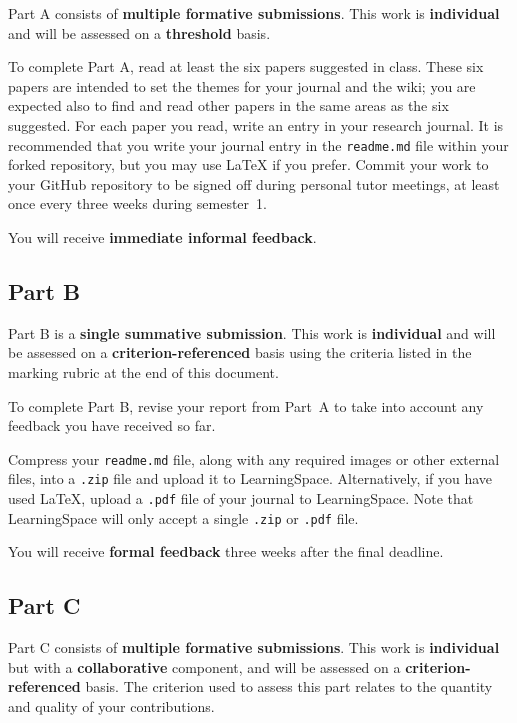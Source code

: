 \documentclass{../fal_assignment}
\begin{document}
Part A consists of \textbf{multiple formative submissions}. This work is \textbf{individual} and will be assessed on a \textbf{threshold} basis.

To complete Part A, read at least the six papers suggested in class.
These six papers are intended to set the themes for your journal and the wiki;
you are expected also to find and read other papers in the same areas as the six suggested.
For each paper you read, write an entry in your research journal.
It is recommended that you write your journal entry in the \texttt{readme.md} file within your forked repository,
but you may use LaTeX if you prefer.
Commit your work to your GitHub repository to be signed off during personal tutor meetings,
at least once every three weeks during semester~1.

You will receive \textbf{immediate informal feedback}.

\subsection*{Part B}

Part B is a \textbf{single summative submission}. This work is \textbf{individual} and will be assessed on a \textbf{criterion-referenced} basis
using the criteria listed in the marking rubric at the end of this document.

To complete Part B, revise your report from Part~A to take into account any feedback you have received so far.

Compress your \texttt{readme.md} file, along with any required images or other external files,
into a \texttt{.zip} file and upload it to LearningSpace.
Alternatively, if you have used LaTeX, upload a \texttt{.pdf} file of your journal to LearningSpace.
Note that LearningSpace will only accept a single \texttt{.zip} or \texttt{.pdf} file.

You will receive \textbf{formal feedback} three weeks after the final deadline.

\subsection*{Part C}

Part C consists of \textbf{multiple formative submissions}. This work is \textbf{individual} but with a \textbf{collaborative} component, and will be assessed on a \textbf{criterion-referenced} basis.
The criterion used to assess this part relates to the quantity and quality of your contributions.
\end{document}
